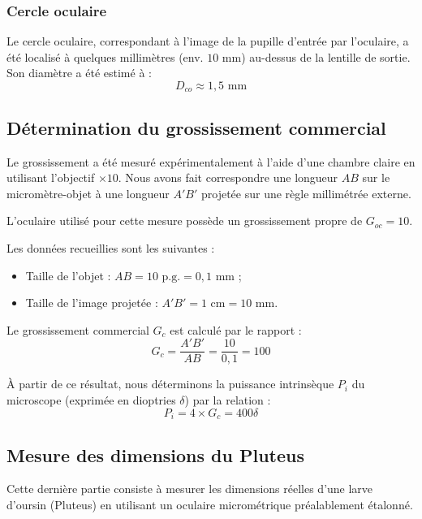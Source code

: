 \subsubsection{Cercle oculaire}

Le cercle oculaire, correspondant à l'image de la pupille d'entrée par l'oculaire,
a été localisé à quelques millimètres (env. $10$ mm) au-dessus de la lentille de sortie.
Son diamètre a été estimé à :
\begin{equation}
    D_{co} \approx 1,5 \text{ mm}
\end{equation}

\subsection{Détermination du grossissement commercial}

Le grossissement a été mesuré expérimentalement à l'aide d'une chambre claire
en utilisant l'objectif $\times 10$.
Nous avons fait correspondre une longueur $AB$ sur le micromètre-objet
à une longueur $A'B'$ projetée sur une règle millimétrée externe.

L'oculaire utilisé pour cette mesure possède un grossissement propre de $G_{oc} = 10$.

Les données recueillies sont les suivantes :
\begin{itemize}
    \item Taille de l'objet : $AB = 10 \text{ p.g.} = 0,1 \text{ mm}$ ;
    \item Taille de l'image projetée : $A'B' = 1 \text{ cm} = 10 \text{ mm}$.
\end{itemize}

Le grossissement commercial $G_c$ est calculé par le rapport :
\begin{equation}
    G_c = \frac{A'B'}{AB} = \frac{10}{0,1} = 100
\end{equation}

À partir de ce résultat, nous déterminons la puissance intrinsèque $P_i$ du microscope
(exprimée en dioptries $\delta$) par la relation :
\begin{equation}
    P_i = 4 \times G_c = 400 \delta
\end{equation}

\subsection{Mesure des dimensions du Pluteus}

Cette dernière partie consiste à mesurer les dimensions réelles d'une larve d'oursin (Pluteus) 
en utilisant un oculaire micrométrique préalablement étalonné.

